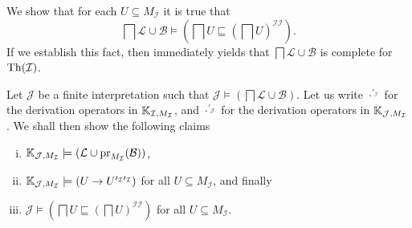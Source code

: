 \begin{Proof}
  We show that for each $U \subseteq M_{\mathcal{I}}$ it is true that
  \begin{equation*}
    \bigsqcap \mathcal{L} \cup \mathcal{B} \models (\bigsqcap U \sqsubseteq (\bigsqcap
    U)^{\mathcal{I}\mathcal{I}}).
  \end{equation*}
  If we establish this fact, then  immediately yields that
  $\bigsqcap \mathcal{L} \cup \mathcal{B}$ is complete for $\operatorname{Th}(\mathcal{I})$.

  Let $\mathcal{J}$ be a finite interpretation such that $\mathcal{J} \models (\bigsqcap
  \mathcal{L} \cup \mathcal{B})$.  Let us write $\cdot^{\prime_{\mathcal{I}}}$ for the
  derivation operators in ${\mathbb{K}}_{\mathcal{I}, M_{\mathcal{I}}}$, and
  $\cdot^{\prime_{\mathcal{J}}}$ for the derivation operators in ${\mathbb{K}}_{\mathcal{J},
    M_{\mathcal{I}}}$.  We shall then show the following claims
  \begin{enumerate}[i. ]
  \item\label{item:20} ${\mathbb{K}}_{\mathcal{J}, M_{\mathcal{I}}} \models (\mathcal{L} \cup
    \operatorname{pr}_{M_{\mathcal{I}}}(\mathcal{B}))$,
  \item ${\mathbb{K}}_{\mathcal{J}, M_{\mathcal{I}}} \models (U \to
    U^{\prime_{\mathcal{I}}\prime_{\mathcal{I}}})$ for all $U \subseteq M_{\mathcal{I}}$,
    and finally
  \item $\mathcal{J} \models (\bigsqcap U \sqsubseteq (\bigsqcap
    U)^{\mathcal{I}\mathcal{I}})$ for all $U \subseteq M_{\mathcal{I}}$.
  \end{enumerate}


\end{Proof}
